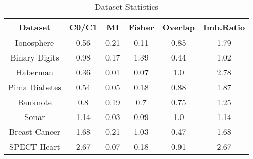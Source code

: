 \begin{table}[htbp]
\caption{Dataset Statistics}
\begin{center}
\begin{tabular}{|c|c|c|c|c|c|}
\hline
\textbf{Dataset} & \textbf{C0/C1} & \textbf{MI} & \textbf{Fisher} & \textbf{Overlap} & \textbf{Imb.Ratio} \\ \hline
Ionosphere & 0.56 & 0.21 & 0.11 & 0.85 & 1.79 \\ \hline
Binary Digits & 0.98 & 0.17 & 1.39 & 0.44 & 1.02 \\ \hline
Haberman & 0.36 & 0.01 & 0.07 & 1.0 & 2.78 \\ \hline
Pima Diabetes & 0.54 & 0.05 & 0.18 & 0.88 & 1.87 \\ \hline
Banknote & 0.8 & 0.19 & 0.7 & 0.75 & 1.25 \\ \hline
Sonar & 1.14 & 0.03 & 0.09 & 1.0 & 1.14 \\ \hline
Breast Cancer & 1.68 & 0.21 & 1.03 & 0.47 & 1.68 \\ \hline
SPECT Heart & 2.67 & 0.07 & 0.18 & 0.91 & 2.67 \\ \hline
\end{tabular}
\label{tab:statistics}
\end{center}
\end{table}